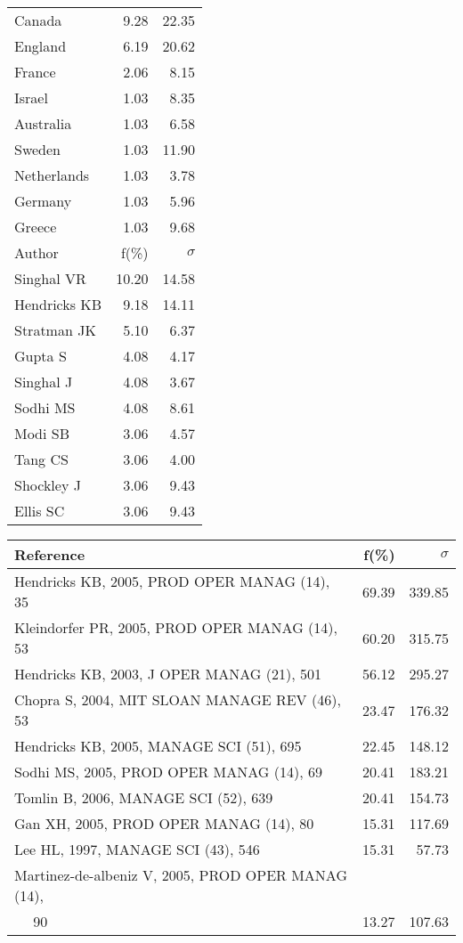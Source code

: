\documentclass[a4paper,11pt]{report}
\begin{document}
\begin{landscape}
\begin{table}[!ht]
{\begin{tabular}{|l r r|}
Canada & 9.28 & 22.35\\
England & 6.19 & 20.62\\
France & 2.06 & 8.15\\
Israel & 1.03 & 8.35\\
Australia & 1.03 & 6.58\\
Sweden & 1.03 & 11.90\\
Netherlands & 1.03 & 3.78\\
Germany & 1.03 & 5.96\\
Greece & 1.03 & 9.68\\
\hline
\hline
Author & f(\%) & $\sigma$\\
\hline
Singhal VR & 10.20 & 14.58\\
Hendricks KB & 9.18 & 14.11\\
Stratman JK & 5.10 & 6.37\\
Gupta S & 4.08 & 4.17\\
Singhal J & 4.08 & 3.67\\
Sodhi MS & 4.08 & 8.61\\
Modi SB & 3.06 & 4.57\\
Tang CS & 3.06 & 4.00\\
Shockley J & 3.06 & 9.43\\
Ellis SC & 3.06 & 9.43\\
\hline
\end{tabular}
}
{\scriptsize\begin{tabular}{|l r r|}
\hline
Reference & f(\%) & $\sigma$\\
\hline
Hendricks KB, 2005, PROD OPER MANAG (14), 35 & 69.39 & 339.85\\
Kleindorfer PR, 2005, PROD OPER MANAG (14), 53 & 60.20 & 315.75\\
Hendricks KB, 2003, J OPER MANAG (21), 501 & 56.12 & 295.27\\
Chopra S, 2004, MIT SLOAN MANAGE REV (46), 53 & 23.47 & 176.32\\
Hendricks KB, 2005, MANAGE SCI (51), 695 & 22.45 & 148.12\\
Sodhi MS, 2005, PROD OPER MANAG (14), 69 & 20.41 & 183.21\\
Tomlin B, 2006, MANAGE SCI (52), 639 & 20.41 & 154.73\\
Gan XH, 2005, PROD OPER MANAG (14), 80 & 15.31 & 117.69\\
Lee HL, 1997, MANAGE SCI (43), 546 & 15.31 & 57.73\\
Martinez-de-albeniz V, 2005, PROD OPER MANAG (14), &  & \\
$\quad$ 90 & 13.27 & 107.63\\

\end{tabular}}
\end{table}
\end{landscape}
\end{document}
